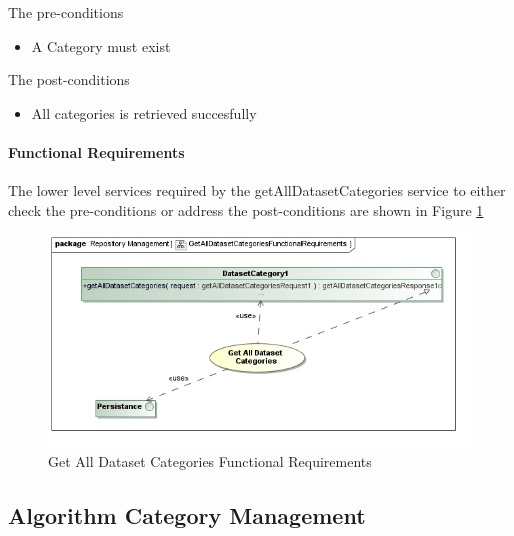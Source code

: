 The pre-conditions
\begin{itemize}
  \item A Category must exist

\end{itemize}

The post-conditions
\begin{itemize}
  \item All categories is retrieved succesfully
\end{itemize}

\paragraph{Functional Requirements}
The lower level services required by the getAllDatasetCategories service to either check the
pre-conditions or address the post-conditions are shown in Figure \ref{fig:getAllDatasetCategoriesFR}
\begin{figure}[H]
  \begin{center}
  \includegraphics[scale=0.6]{../Diagrams and Charts/Test Data/GetAllDatasetCategoriesFunctionalRequirements.jpg}
  \caption{Get All Dataset Categories Functional Requirements}
  \label{fig:getAllDatasetCategoriesFR}
  \end{center}
\end{figure}

\subsection{Algorithm Category Management}

